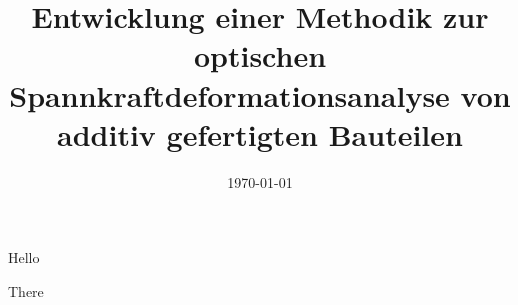 \documentclass[t, aspectratio=169]{beamer}
\begin{document}
\title[]{Entwicklung einer Methodik zur optischen Spannkraftdeformationsanalyse von additiv gefertigten Bauteilen}
\date{\today}
\begin{frame}[plain]
  \maketitle
  \vspace{1.5cm}  
\end{frame}

\begin{frame}[plain]
  Hello
\end{frame}

\begin{frame}[plain]
  There
\end{frame}

%
\end{document}
